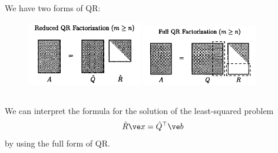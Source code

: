 \documentclass[11pt,letterpaper]{article}
\begin{document}
\subsection{}
We have two forms of QR:
\begin{figure}[H]
    \centering
    \includegraphics[width = 0.45\textwidth]{figs/TB_reducedQR}
    \includegraphics[width = 0.45\textwidth]{figs/TB_fullQR}
\end{figure}

\subsection{}
We can interpret the formula for the solution of the least-squared problem
\begin{align*}
    \hat R \ve x = \hat Q^\top \ve b
\end{align*}
by using the full form of QR.

\newpage
\end{document}
